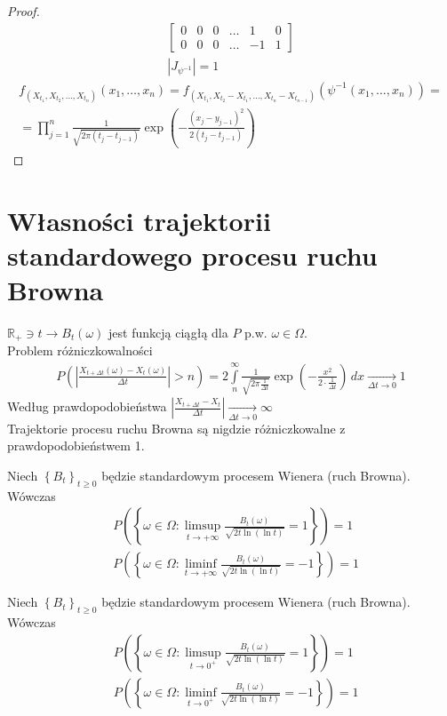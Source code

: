 \begin{twr}
\begin{proof}
\begin{gather*}
\begin{bmatrix}
	0      & 0      & 0      & \ldots & 1      & 0      \\
	0      & 0      & 0      & \ldots & -1     & 1
\end{bmatrix}\\
\left|J_{\psi^{-1}}\right|=1
\end{gather*}
\begin{gather*}
f_{\left(X_{t_1},X_{t_2},\dots,X_{t_n}\right)}\left(x_1,\dots,x_n\right)=
f_{\left(X_{t_1},X_{t_2}-X_{t_1},\dots,X_{t_n}-X_{t_{n-1}}\right)}\left(\psi^{-1}\left(x_1,\dots,x_n\right)\right)
=\\=
\prod_{j=1}^{n}\frac{1}{\sqrt{2\pi(t_j-t_{j-1})}}\exp\left(-\frac{\left(x_j-y_{j-1}\right)^2}{2\left(t_j-t_{j-1}\right)}\right)
\end{gather*}
\end{proof}
\end{twr}
\section{Własności trajektorii standardowego procesu ruchu Browna}
$ \mathbb R _+\ni t\to B_t(\omega) $ jest funkcją ciągłą dla $ P $ p.w. $ \omega\in\Omega $.\\
Problem różniczkowalności
\begin{gather*}
P\left(\left|\frac{X_{t+\Delta t}(\omega)-X_t(\omega)}{\Delta t}\right|>n\right)=
2\int\limits_{n}^{\infty }\frac{1}{\sqrt{2\pi \frac{1}{\Delta t}}}\exp\left(-\frac{x^2}{2\cdot \frac{1}{\Delta t}}\right)\,dx\xrightarrow[\Delta t\to0]{}1
\end{gather*}
Według prawdopodobieństwa $ \left|\frac{X_{t+\Delta t}-X_t}{\Delta t}\right|\xrightarrow[\Delta t\to0]{}\infty $\\
Trajektorie procesu ruchu Browna są nigdzie różniczkowalne z prawdopodobieństwem 1.
\begin{twr}
Niech $ \left\{B_t\right\} _{t\ge 0}$ będzie standardowym procesem Wienera (ruch Browna). Wówczas
\begin{align*}
&P\left(\left\{\omega\in\Omega:\limsup_{t\to+\infty }\frac{B_t(\omega)}{\sqrt{2t\ln \left(\ln t\right)}}=1\right\}\right)=1\\
&P\left(\left\{\omega\in\Omega:\liminf_{t\to+\infty }\frac{B_t(\omega)}{\sqrt{2t\ln \left(\ln t\right)}}=-1\right\}\right)=1
\end{align*}
\end{twr}
\begin{twr}
Niech $ \left\{B_t\right\} _{t\ge 0}$ będzie standardowym procesem Wienera (ruch Browna). Wówczas
\begin{align*}
&P\left(\left\{\omega\in\Omega:\limsup_{t\to0^+ }\frac{B_t(\omega)}{\sqrt{2t\ln \left(\ln t\right)}}=1\right\}\right)=1\\
&P\left(\left\{\omega\in\Omega:\liminf_{t\to0^+ }\frac{B_t(\omega)}{\sqrt{2t\ln \left(\ln t\right)}}=-1\right\}\right)=1
\end{align*}
\end{twr}


